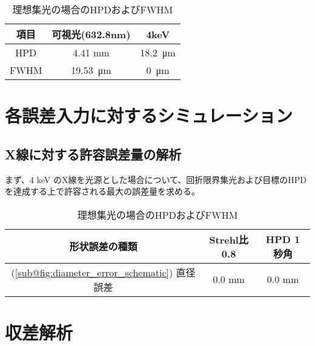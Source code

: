 \begin{table}[!ht]
\begin{center}
  \begin{tabular}{|c|c|c|} \hline
    項目 & 可視光(632.8nm) & 4keV \\ \hline
    HPD & 4.41 mm & \SI{18.2}{\micro \metre} \\
    FWHM & \SI{19.53}{\micro \metre} & \SI{0}{\micro \metre} \\ \hline
  \end{tabular}
  \caption{理想集光の場合のHPDおよびFWHM}
  \label{tb:ideal_focus_evaluation}
\end{center}
\end{table}

\clearpage
\newpage

\section{各誤差入力に対するシミュレーション}
\label{chap2_simulation_error_response}

\subsection{X線に対する許容誤差量の解析}
\label{chap2_xray_allowed_error}

まず、4 keV のX線を光源とした場合について、回折限界集光および目標のHPDを達成する上で許容される最大の誤差量を求める。

\begin{table}[!ht]
\begin{center}
  \begin{tabular}{|c|c|c|} \hline
    形状誤差の種類 & Strehl比0.8 & HPD 1 秒角 \\ \hline
    (\ref{sub@fig:diameter_error_schematic}) 直径誤差 & 0.0 mm & 0.0 mm
  \end{tabular}
  \caption{理想集光の場合のHPDおよびFWHM}
  \label{tb:xray_allowed_error}
\end{center}
\end{table}


\clearpage
\newpage
\section{収差解析}
\label{chap2_simulation_zernike_analysis}

